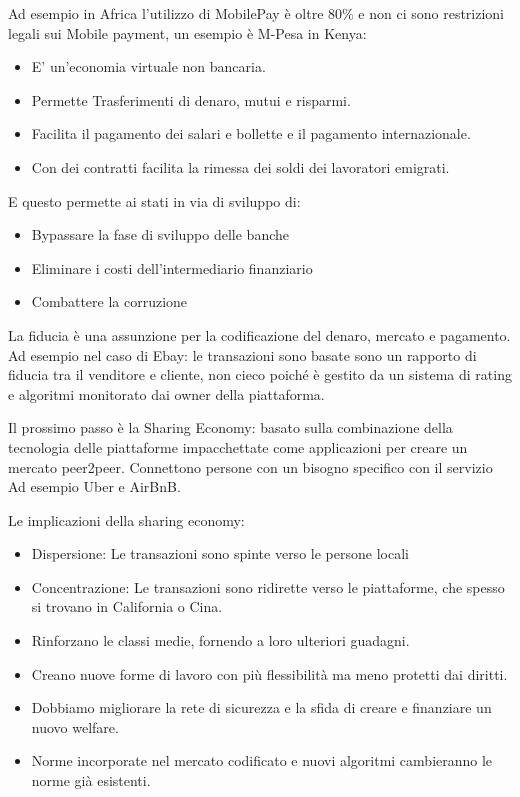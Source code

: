 \documentclass[a4page, 11pt]{article}
\begin{document}
Ad esempio in Africa l’utilizzo di MobilePay è oltre 80\% e non ci sono restrizioni legali sui Mobile payment, un esempio è M-Pesa in Kenya:
\begin{itemize}
	\item E’ un’economia virtuale non bancaria.
	\item Permette Trasferimenti di denaro, mutui e risparmi.
	\item Facilita il pagamento dei salari e bollette e il pagamento internazionale.
	\item Con dei contratti facilita la rimessa dei soldi dei lavoratori emigrati.
\end{itemize}
E questo permette ai stati in via di sviluppo di:
\begin{itemize}
	\item Bypassare la fase di sviluppo delle banche
	\item Eliminare i costi dell'intermediario finanziario
	\item Combattere la corruzione
\end{itemize}
La fiducia è una assunzione per la codificazione del denaro, mercato e pagamento. Ad esempio nel caso di Ebay: le transazioni sono basate sono un rapporto di fiducia tra il venditore e cliente, non cieco poiché è gestito da un sistema di rating e algoritmi monitorato dai owner della piattaforma. 

Il prossimo passo è la Sharing Economy: basato sulla combinazione della tecnologia delle piattaforme impacchettate come applicazioni per creare un mercato peer2peer. Connettono persone con un bisogno specifico con il servizio Ad esempio Uber e AirBnB. 

Le implicazioni della sharing economy:
\begin{itemize}
	\item Dispersione: Le transazioni sono spinte verso le persone locali
	\item Concentrazione: Le transazioni sono ridirette verso le piattaforme, che spesso si trovano in California o Cina.
	\item Rinforzano le classi medie, fornendo a loro ulteriori guadagni.
	\item Creano nuove forme di lavoro con più flessibilità ma meno protetti dai diritti.
	\item Dobbiamo migliorare la rete di sicurezza e la sfida di creare e finanziare un nuovo welfare.
	\item Norme incorporate nel mercato codificato e nuovi algoritmi cambieranno le norme già esistenti.
\end{itemize} 
\end{document}
